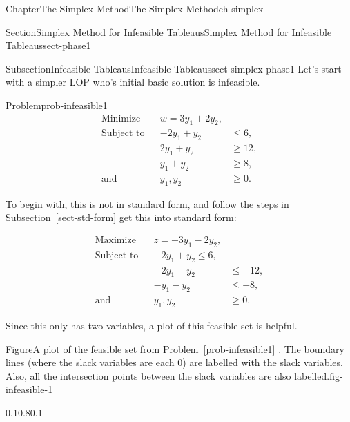 \documentclass[oneside,10pt,]{book}
\newcommand{\xreffont}{\relax}
\numberwithin{equation}{section}
\newcommand{\amp}{&}
\begin{document}
\begin{chapterptx}{Chapter}{The Simplex Method}{}{The Simplex Method}{}{}{ch-simplex}
\begin{sectionptx}{Section}{Simplex Method for Infeasible Tableaus}{}{Simplex Method for Infeasible Tableaus}{}{}{sect-phase1}
\begin{introduction}{}
\end{introduction}%
%
%
\typeout{************************************************}
\typeout{************************************************}
%
\begin{subsectionptx}{Subsection}{Infeasible Tableaus}{}{Infeasible Tableaus}{}{}{sect-simplex-phase1}
Let's start with a simpler LOP who's initial basic solution is infeasible.%
\begin{problem}{Problem}{}{prob-infeasible1}%
%
\begin{equation*}
\begin{aligned} \text{Minimize} \amp \amp w  = 3y_1 + 2y_2, \amp \\ \text{Subject to}\amp \amp -2y_1 + y_2 \amp \leq 6, \\ \amp \amp 2y_1 + y_2 \amp \geq 12, \\ \amp \amp y_1 + y_2 \amp \geq 8, \\ \text{and} \amp \amp y_1, y_2 \amp \geq 0.
\end{aligned}
\end{equation*}
%
\end{problem}
To begin with, this is not in standard form, and follow the steps in \hyperref[sect-std-form]{Subsection~{\xreffont\ref{sect-std-form}}} get this into standard form:%
\par
%
\begin{equation*}
\begin{aligned} \text{Maximize} \amp \amp z  = -3y_1 - 2y_2,\amp \\ \text{Subject to}\amp \amp -2y_1 + y_2 \leq 6, \\ \amp \amp - 2y_1 - y_2 \amp \leq -12, \\ \amp \amp -y_1 - y_2 \amp \leq -8, \\ \text{and}\amp \amp y_1, y_2 \amp \geq 0.
\end{aligned}
\end{equation*}
%
\par
Since this only has two variables, a plot of this feasible set is helpful.%
\begin{figureptx}{Figure}{A plot of the feasible set from \hyperref[prob-infeasible1]{Problem~{\xreffont\ref{prob-infeasible1}}} . The boundary lines (where the slack variables are each 0) are labelled with the slack variables. Also, all the intersection points between the slack variables are also labelled.}{fig-infeasible-1}{}%
\begin{image}{0.1}{0.8}{0.1}{}%
\resizebox{\linewidth}{!}{%
}
\end{image}
\end{figureptx}
\end{subsectionptx}
\end{sectionptx}
\end{chapterptx}
\end{document}
